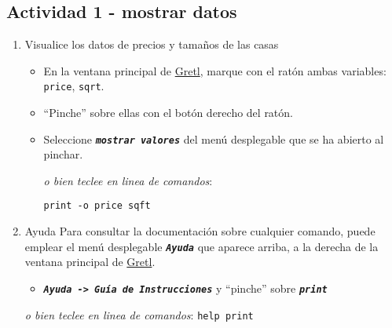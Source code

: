 \documentclass[11pt]{article}
\begin{document}
\subsection{Actividad 1 - mostrar datos}
\label{sec:org4003853}
\begin{enumerate}
\item Visualice los datos de precios y tamaños de las casas
\label{sec:org430cd84}
\begin{itemize}
\item En la ventana principal de \href{https://gretl.sourceforge.net/es.html}{Gretl}, marque con el ratón ambas
variables: \texttt{price}, \texttt{sqrt}.
\item ``Pinche'' sobre ellas con el botón derecho del ratón.
\item Seleccione \textbf{\emph{\texttt{mostrar valores}}} del menú desplegable que se ha
abierto al pinchar.

{\vspace{1pt} \footnotesize \color{gray!70!black}
\emph{o bien teclee en linea de comandos}:
\begin{verbatim}
print -o price sqft
\end{verbatim}
}
\end{itemize}

\vspace{-3pt}

\item Ayuda
\label{sec:org1d38316}
Para consultar la documentación sobre cualquier comando, puede emplear
el menú desplegable \textbf{\emph{\texttt{Ayuda}}} que aparece arriba, a la derecha de la
ventana principal de \href{https://gretl.sourceforge.net/es.html}{Gretl}.
\begin{itemize}
\item \textbf{\emph{\texttt{Ayuda -> Guía de Instrucciones}}} y ``pinche'' sobre \textbf{\emph{\texttt{print}}}
\end{itemize}

{\vspace{0pt} \footnotesize \color{gray!70!black}
\emph{o bien teclee en linea de comandos}: \texttt{help print}
}
\end{enumerate}
\end{document}
